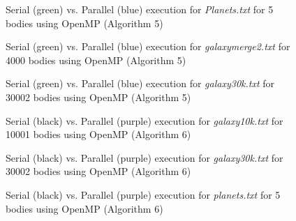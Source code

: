 \begin{figure}[thpb]
      \centering
      \caption{Serial (green) vs. Parallel (blue) execution for \textit{Planets.txt} \cite{c4} for 5 bodies using OpenMP (Algorithm 5)
}
      \label{fig:9}
\end{figure}

\begin{figure}[thpb]
      \centering
      \caption{Serial (green) vs. Parallel (blue) execution for \textit{galaxymerge2.txt} \cite{c4} for 4000 bodies using OpenMP (Algorithm 5)
}
      \label{fig:10}
\end{figure}

\begin{figure}[thpb]
      \centering
      \caption{Serial (green) vs. Parallel (blue) execution for \textit{galaxy30k.txt} \cite{c4} for 30002 bodies using OpenMP (Algorithm 5)
}
      \label{fig:11}
\end{figure}

\begin{figure}[thpb]
      \centering
      \caption{Serial (black) vs. Parallel (purple) execution for \textit{galaxy10k.txt} \cite{c4} for 10001 bodies using OpenMP (Algorithm 6)}
      \label{fig:12}
\end{figure}

\begin{figure}[thpb]
      \centering
      \caption{Serial (black) vs. Parallel (purple) execution for \textit{galaxy30k.txt} \cite{c4} for 30002 bodies using OpenMP (Algorithm 6)}
      \label{fig:13}
\end{figure}

\begin{figure}[thpb]
      \centering
      \caption{Serial (black) vs. Parallel (purple) execution for \textit{planets.txt} \cite{c4} for 5 bodies using OpenMP (Algorithm 6)}
      \label{fig:14}
\end{figure}

